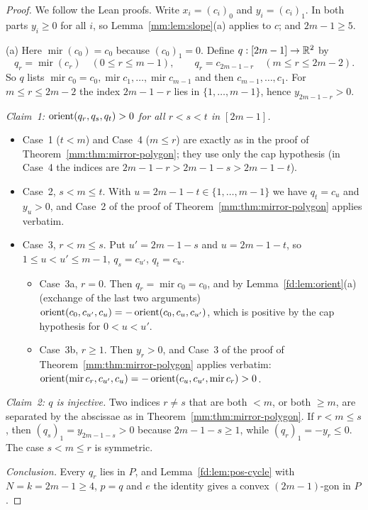 \begin{proof}
We follow the Lean proofs. Write $x_i=(c_i)_0$ and $y_i=(c_i)_1$. In both parts $y_i\ge0$ for all $i$,
so Lemma~\ref{mm:lem:slope}(a) applies to $c$; and $2m-1\ge5$.

(a) Here $\operatorname{mir}(c_0)=c_0$ because $(c_0)_1=0$. Define $q:[2m-1]\to\mathbb R^2$ by
\[ q_r=\operatorname{mir}(c_r)\quad(0\le r\le m-1),\qquad q_r=c_{2m-1-r}\quad(m\le r\le 2m-2). \]
So $q$ lists $\operatorname{mir}c_0=c_0,\operatorname{mir}c_1,\dots,\operatorname{mir}c_{m-1}$ and then
$c_{m-1},\dots,c_1$. For $m\le r\le 2m-2$ the index $2m-1-r$ lies in $\{1,\dots,m-1\}$, hence
$y_{2m-1-r}>0$.

\emph{Claim~1: $\operatorname{orient}(q_r,q_s,q_t)>0$ for all $r<s<t$ in $[2m-1]$.}
\begin{itemize}
\item Case~1 ($t<m$) and Case~4 ($m\le r$) are exactly as in the proof of
  Theorem~\ref{mm:thm:mirror-polygon}; they use only the cap hypothesis (in Case~4 the indices are
  $2m-1-r>2m-1-s>2m-1-t$).
\item Case~2, $s<m\le t$. With $u=2m-1-t\in\{1,\dots,m-1\}$ we have $q_t=c_u$ and $y_u>0$, and Case~2 of
  the proof of Theorem~\ref{mm:thm:mirror-polygon} applies verbatim.
\item Case~3, $r<m\le s$. Put $u'=2m-1-s$ and $u=2m-1-t$, so $1\le u<u'\le m-1$, $q_s=c_{u'}$, $q_t=c_u$.
  \begin{itemize}
  \item Case~3a, $r=0$. Then $q_r=\operatorname{mir}c_0=c_0$, and by Lemma~\ref{fd:lem:orient}(a)
    (exchange of the last two arguments) $\operatorname{orient}(c_0,c_{u'},c_u)=-\operatorname{orient}(c_0,c_u,c_{u'})$, which is
    positive by the cap hypothesis for $0<u<u'$.
  \item Case~3b, $r\ge1$. Then $y_r>0$, and Case~3 of the proof of Theorem~\ref{mm:thm:mirror-polygon}
    applies verbatim:
    $\operatorname{orient}(\operatorname{mir}c_r,c_{u'},c_u)=-\operatorname{orient}(c_u,c_{u'},\operatorname{mir}c_r)>0$.
  \end{itemize}
\end{itemize}

\emph{Claim~2: $q$ is injective.} Two indices $r\ne s$ that are both $<m$, or both $\ge m$, are separated by
the abscissae as in Theorem~\ref{mm:thm:mirror-polygon}. If $r<m\le s$, then $(q_s)_1=y_{2m-1-s}>0$
because $2m-1-s\ge1$, while $(q_r)_1=-y_r\le0$. The case $s<m\le r$ is symmetric.

\emph{Conclusion.} Every $q_r$ lies in $P$, and Lemma~\ref{fd:lem:pos-cycle} with $N=k=2m-1\ge4$, $p=q$
and $e$ the identity gives a convex $(2m-1)$-gon in $P$.


\end{proof}
